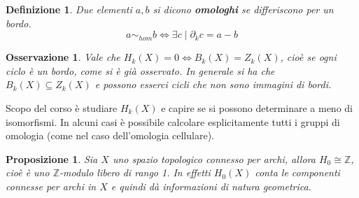 \documentclass[10pt, twoside=false, x11names]{scrbook}
\newtheorem{proposition}[theorem]{Proposizione}
\newtheorem{osservation}[theorem]{Osservazione}
\newtheorem{definition}[theorem]{Definizione}
\newcommand{\Z}{\mathbb{Z}}
\begin{document}
\begin{definition}
  Due elementi $ a,b $ si dicono \textbf{omologhi}  se differiscono per un bordo.
  \[
    a \sim_{hom} b \Leftrightarrow \exists c \; | \; \partial_k c = a - b
  \]
\end{definition}

\begin{osservation}
  Vale che $  H_k(X) = 0 \Leftrightarrow B_k(X) = Z_k(X) $, cioè se ogni ciclo è un bordo, come si è già osservato.
  In generale si ha che $ B_k(X) \subseteq Z_k(X) $ e possono esserci cicli che non sono immagini di bordi.
\end{osservation}

Scopo del corso è studiare $ H_k(X) $ e capire se si possono determinare a meno di isomorfismi.
In alcuni casi è possibile calcolare esplicitamente tutti i gruppi di omologia (come nel caso dell'omologia
cellulare).

\begin{proposition}
  Sia $ X $ uno spazio topologico connesso per archi, allora $ H_0 \cong \Z $, cioè è uno $ \Z $-modulo libero di rango 1.
  In effetti $ H_0(X) $ \emph{conta} le componenti connesse per archi in $ X $ e quindi dà informazioni di natura geometrica.
\end{proposition}
\end{document}
